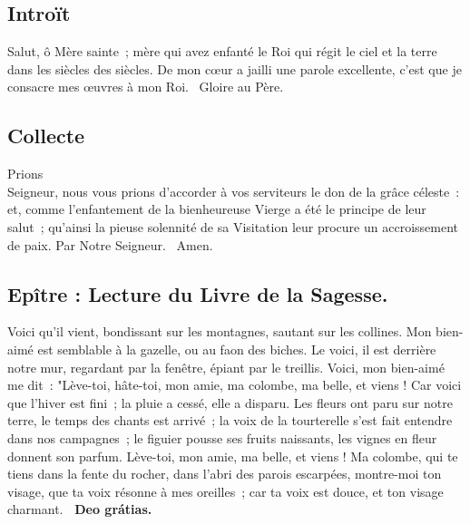 


\begin{multicols}{2}
\subsection*{Introït}
{Salut, ô Mère sainte~; mère qui avez enfanté le Roi qui régit le ciel et la terre dans les siècles des siècles.}
De mon cœur a jailli une parole excellente, c’est que je consacre mes œuvres à mon Roi. \vb\ Gloire au Père.

\subsection*{Collecte}
{Prions\\
Seigneur, nous vous prions d’accorder à vos serviteurs le don de la grâce céleste~: et, comme l’enfantement de la bienheureuse Vierge a été le principe de leur salut~; qu’ainsi la pieuse solennité de sa Visitation leur procure un accroissement de paix. Par Notre Seigneur.}
{\textbf \rb\ Amen.}


\subsection*{Epître : Lecture du Livre de la Sagesse.}
Voici qu’il vient, bondissant sur les montagnes, sautant sur les collines. Mon bien-aimé est semblable à la gazelle, ou au faon des biches. Le voici, il est derrière notre mur, regardant par la fenêtre, épiant par le treillis. Voici, mon bien-aimé me dit~: "Lève-toi, hâte-toi, mon amie, ma colombe, ma belle, et viens ! Car voici que l’hiver est fini~; la pluie a cessé, elle a disparu. Les fleurs ont paru sur notre terre, le temps des chants est arrivé~; la voix de la tourterelle s’est fait entendre dans nos campagnes~; le figuier pousse ses fruits naissants, les vignes en fleur donnent son parfum. Lève-toi, mon amie, ma belle, et viens ! Ma colombe, qui te tiens dans la fente du rocher, dans l’abri des parois escarpées, montre-moi ton visage, que ta voix résonne à mes oreilles~; car ta voix est douce, et ton visage charmant.
\textbf{\rb\ Deo grátias.}


\end{multicols}
